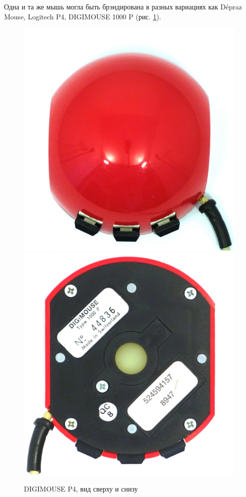 \documentclass[11pt, a4paper]{article}
\begin{document}
Одна и та же мышь могла быть брэндирована в разных вариациях как Dépraz Mouse, Logitech P4, DIGIMOUSE 1000 P (рис. \ref{fig:DIGIMOUSEP4TopAndBottom}).

\begin{figure}[h]
    \centering
    \includegraphics[scale=0.4]{1982_depraz_digimouse/top_60.jpg}
    \includegraphics[scale=0.37]{1982_depraz_digimouse/bottom_60.jpg}
    \caption{DIGIMOUSE P4, вид сверху и снизу}
    \label{fig:DIGIMOUSEP4TopAndBottom}
\end{figure}
\end{document}
